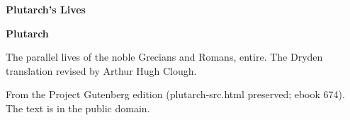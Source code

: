 \documentclass[11pt,letterpaper]{article}
\begin{document}
\color{ink}

\begin{titlepage}
\centering
\vspace*{4em}
{\LARGE\bfseries\color{heading} Plutarch's Lives\par}
\vspace{2em}
{\Large\bfseries\color{heading} Plutarch\par}
\vspace{2.5em}
{\itshape\color{subhead}\parbox{0.8\linewidth}{\centering The parallel lives of the noble Grecians and Romans, entire. The Dryden translation revised by Arthur Hugh Clough.\par}}
\vfill
{\small From the Project Gutenberg edition (plutarch-src.html preserved; ebook 674). The text is in the public domain.\par}
\vspace{2em}
\end{titlepage}

\tableofcontents


\end{document}
